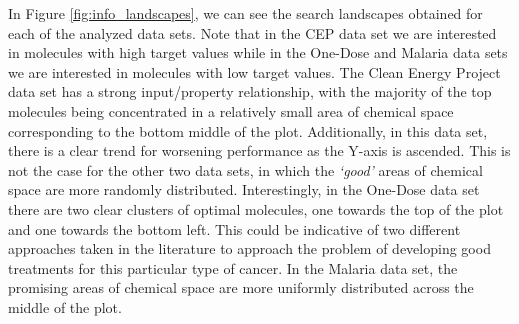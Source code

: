 In Figure \ref{fig:info_landscapes}, we can see the search landscapes obtained
for each of the analyzed data sets. Note that in the CEP data set we are interested in molecules with high target values while in the One-Dose and Malaria data sets we are interested in molecules with low target values.
The Clean Energy Project data set has a strong input/property
relationship, with the majority of the top molecules being concentrated in a
relatively small area of chemical space corresponding to the bottom middle of the plot. 
Additionally, in this data set, there
is a clear trend for worsening performance as the Y-axis is ascended.  This is
not the case for the other two data sets, in which the \emph{`good'} areas of chemical
space are more randomly distributed. Interestingly, in the One-Dose
data set there are two clear clusters of optimal molecules, one
towards the top of the plot and one towards the bottom left. This could be
indicative of two different approaches taken in the literature to approach the
problem of developing good treatments for this particular type of cancer. In the Malaria data set, the promising areas of chemical space are more uniformly distributed across the middle of the plot.